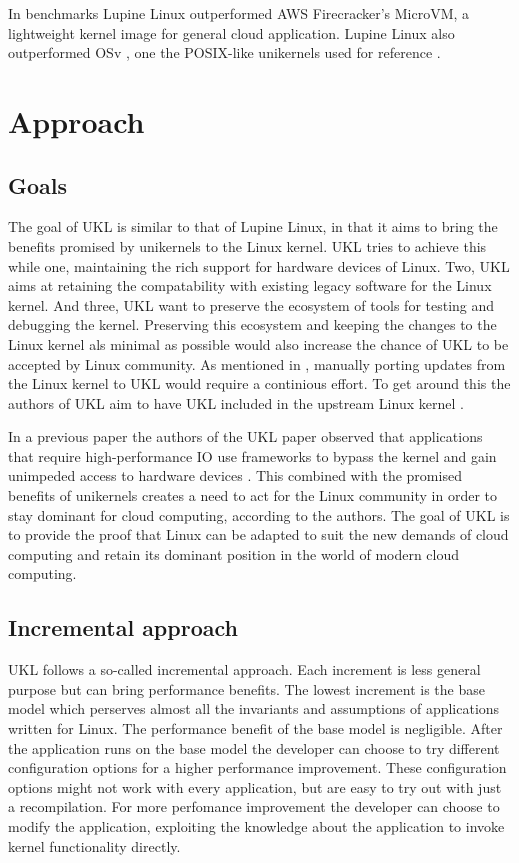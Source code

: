 \documentclass[10pt,twocolumn,a4paper]{article}
\begin{document}
    In benchmarks Lupine Linux outperformed AWS Firecracker's MicroVM, a lightweight 
    kernel image for general cloud application. 
    Lupine Linux also outperformed OSv \cite{osv}, 
    one the POSIX-like unikernels used for reference \cite{kuo20}.

\section{Approach}\label{sec:approach}
  \subsection{Goals}\label{sec:goals}
    The goal of UKL is similar to that of Lupine Linux, in that it aims
    to bring the benefits promised by unikernels to the Linux kernel.
    UKL tries to achieve this while one, maintaining the rich support for hardware devices of Linux.
    Two, UKL aims at retaining the compatability with existing legacy software for the Linux kernel.
    And three, UKL want to preserve the ecosystem of tools for testing and debugging the kernel.
    Preserving this ecosystem and keeping the changes to the Linux kernel als minimal as possible
    would also increase the chance of UKL to be accepted by Linux community.
    As mentioned in , manually porting updates from
    the Linux kernel to UKL would require a continious effort.
    To get around this the authors of UKL aim to have UKL included in the upstream Linux kernel
    \cite{ukl-redhat-post}.

    In a previous paper \cite{raza19} the authors of the UKL paper \cite{raza23}
    observed that applications that require high-performance IO use frameworks
    to bypass the kernel and gain unimpeded access to hardware devices \cite{raza19}.
    This combined with the promised benefits of unikernels creates a need to act
    for the Linux community in order to stay dominant for cloud computing, according to the authors.
    The goal of UKL is to provide the proof that Linux can be adapted to suit the new demands of
    cloud computing and retain its dominant position in the world of modern cloud computing.

  \subsection{Incremental approach}
    UKL follows a so-called incremental approach. 
    Each increment is less general purpose but can bring performance benefits.
    The lowest increment is the base model which perserves almost all the 
    invariants and assumptions of applications written for Linux.
    The performance benefit of the base model is negligible.
    After the application runs on the base model the developer can choose to try different
    configuration options for a higher performance improvement.
    These configuration options might not work with every application, but are easy to try out
    with just a recompilation.
    For more perfomance improvement the developer can choose to modify the application, exploiting the
    knowledge about the application to invoke kernel functionality directly.
\end{document}
